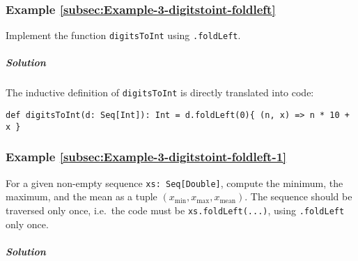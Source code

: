 \subsubsection{Example \label{subsec:Example-3-digitstoint-foldleft}\ref{subsec:Example-3-digitstoint-foldleft}}

Implement the function \lstinline!digitsToInt! using \lstinline!.foldLeft!.

\subparagraph{Solution}

The inductive definition of \lstinline!digitsToInt! is directly translated
into code:

\begin{lstlisting}
def digitsToInt(d: Seq[Int]): Int = d.foldLeft(0){ (n, x) => n * 10 + x }
\end{lstlisting}


\subsubsection{Example \label{subsec:Example-3-digitstoint-foldleft-1}\ref{subsec:Example-3-digitstoint-foldleft-1}}

For a given non-empty sequence \lstinline!xs: Seq[Double]!, compute
the minimum, the maximum, and the mean as a tuple $\left(x_{\min},x_{\max},x_{\text{mean}}\right)$.
The sequence should be traversed only once, i.e.~the code must be
\lstinline!xs.foldLeft(...)!, using \lstinline!.foldLeft! only once.

\subparagraph{Solution}

